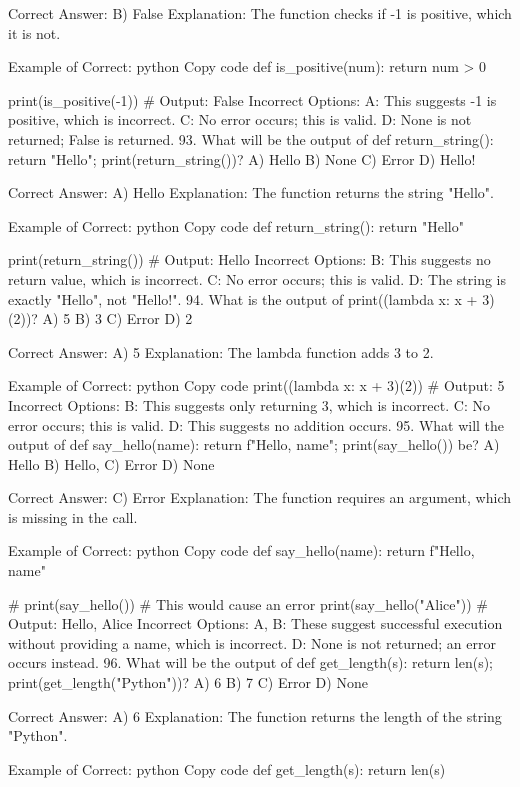 Correct Answer: B) False
Explanation: The function checks if -1 is positive, which it is not.

Example of Correct:
python
Copy code
def is_positive(num):
    return num > 0

print(is_positive(-1))  # Output: False
Incorrect Options:
A: This suggests -1 is positive, which is incorrect.
C: No error occurs; this is valid.
D: None is not returned; False is returned.
93. What will be the output of def return_string(): return "Hello"; print(return_string())?
A) Hello
B) None
C) Error
D) Hello!

Correct Answer: A) Hello
Explanation: The function returns the string "Hello".

Example of Correct:
python
Copy code
def return_string():
    return "Hello"

print(return_string())  # Output: Hello
Incorrect Options:
B: This suggests no return value, which is incorrect.
C: No error occurs; this is valid.
D: The string is exactly "Hello", not "Hello!".
94. What is the output of print((lambda x: x + 3)(2))?
A) 5
B) 3
C) Error
D) 2

Correct Answer: A) 5
Explanation: The lambda function adds 3 to 2.

Example of Correct:
python
Copy code
print((lambda x: x + 3)(2))  # Output: 5
Incorrect Options:
B: This suggests only returning 3, which is incorrect.
C: No error occurs; this is valid.
D: This suggests no addition occurs.
95. What will the output of def say_hello(name): return f"Hello, {name}"; print(say_hello()) be?
A) Hello
B) Hello,
C) Error
D) None

Correct Answer: C) Error
Explanation: The function requires an argument, which is missing in the call.

Example of Correct:
python
Copy code
def say_hello(name):
    return f"Hello, {name}"

# print(say_hello())  # This would cause an error
print(say_hello("Alice"))  # Output: Hello, Alice
Incorrect Options:
A, B: These suggest successful execution without providing a name, which is incorrect.
D: None is not returned; an error occurs instead.
96. What will be the output of def get_length(s): return len(s); print(get_length("Python"))?
A) 6
B) 7
C) Error
D) None

Correct Answer: A) 6
Explanation: The function returns the length of the string "Python".

Example of Correct:
python
Copy code
def get_length(s):
    return len(s)

